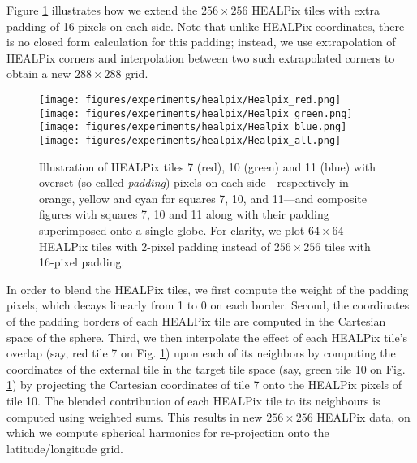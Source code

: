 Figure \ref{fig:overset} illustrates how we extend the $256 \times 256$ HEALPix tiles with extra padding of 16 pixels on each side. Note that unlike HEALPix coordinates, there is no closed form calculation for this padding; instead, we use extrapolation of HEALPix corners and interpolation between two such extrapolated corners to obtain a new $288 \times 288$ grid.

\begin{figure}
    \centering
    \texttt{[image: figures/experiments/healpix/Healpix\_red.png]}
    \texttt{[image: figures/experiments/healpix/Healpix\_green.png]}
    \texttt{[image: figures/experiments/healpix/Healpix\_blue.png]}
    \texttt{[image: figures/experiments/healpix/Healpix\_all.png]}
    \hfill
    \caption{Illustration of HEALPix tiles 7 (red), 10 (green) and 11 (blue) with overset (so-called \emph{padding}) pixels on each side---respectively in orange, yellow and cyan for squares 7, 10, and 11---and composite figures with squares 7, 10 and 11 along with their padding superimposed onto a single globe. For clarity, we plot $64 \times 64$ HEALPix tiles with 2-pixel padding instead of $256 \times 256$ tiles with 16-pixel padding.}
    \label{fig:overset}
\end{figure}

In order to blend the HEALPix tiles, we first compute the weight of the padding pixels, which decays linearly from 1 to 0 on each border.
Second, the coordinates of the padding borders of each HEALPix tile are computed in the Cartesian space of the sphere. Third, we then interpolate the effect of each HEALPix tile's overlap (say, red tile 7 on Fig. \ref{fig:overset}) upon each of its neighbors by computing the coordinates of the external tile in the target tile space (say, green tile 10 on Fig. \ref{fig:overset}) by projecting the Cartesian coordinates of tile 7 onto the HEALPix pixels of tile 10. The blended contribution of each HEALPix tile to its neighbours is computed using weighted sums. This results in new $256 \times 256$ HEALPix data, on which we compute spherical harmonics for re-projection onto the latitude/longitude grid.
